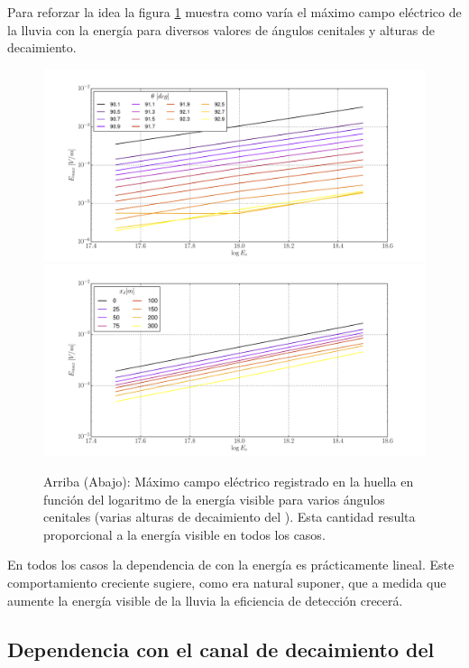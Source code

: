 	Para reforzar la idea la figura \ref{fig:ev_dependence2} muestra como var\'ia el m\'aximo campo el\'ectrico de la lluvia con la energ\'ia para diversos valores de \'angulos cenitales y alturas de decaimiento.
	\begin{figure}[ht!]
		\centering
		\includegraphics[width=\textwidth]{./fig/simulacionRadio/maxDep/eMaxThEv}
		\includegraphics[width=\textwidth]{./fig/simulacionRadio/maxDep/eMaxXdEv}
		\caption{\label{fig:ev_dependence2}
		Arriba (Abajo): M\'aximo campo el\'ectrico registrado en la huella en funci\'on del logaritmo de la energ\'ia visible para varios \'angulos cenitales (varias alturas de decaimiento del \tauon{}).
		Esta cantidad resulta proporcional a la energ\'ia visible en todos los casos.
		}
	\end{figure}
	En todos los casos la dependencia de con la energ\'ia es pr\'acticamente lineal.
	Este comportamiento creciente sugiere, como era natural suponer, que a medida que aumente la energ\'ia visible de la lluvia la eficiencia de detecci\'on crecer\'a.
	
	
	\subsection{Dependencia con el canal de decaimiento del \tauon{}}
	\label{sbsc:decayChRadio}
	
